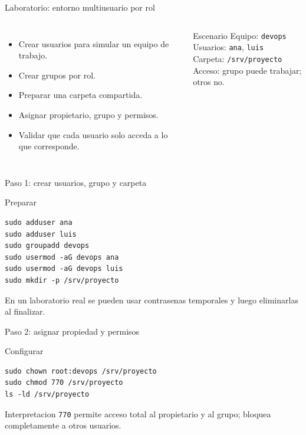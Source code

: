 \documentclass[aspectratio=169]{beamer}
\begin{document}
\begin{frame}{Laboratorio: entorno multiusuario por rol}
  \begin{columns}[c]
    \begin{itemize}
      \item Crear usuarios para simular un equipo de trabajo.
      \item Crear grupos por rol.
      \item Preparar una carpeta compartida.
      \item Asignar propietario, grupo y permisos.
      \item Validar que cada usuario solo acceda a lo que corresponde.
    \end{itemize}
    \begin{block}{Escenario}
      \small Equipo: \texttt{devops}\\
      Usuarios: \texttt{ana}, \texttt{luis}\\
      Carpeta: \texttt{/srv/proyecto}\\
      Acceso: grupo puede trabajar; otros no.
    \end{block}
  \end{columns}
\end{frame}

\begin{frame}[fragile]{Paso 1: crear usuarios, grupo y carpeta}
  \begin{exampleblock}{Preparar}
\begin{verbatim}
sudo adduser ana
sudo adduser luis
sudo groupadd devops
sudo usermod -aG devops ana
sudo usermod -aG devops luis
sudo mkdir -p /srv/proyecto
\end{verbatim}
  \end{exampleblock}
  \vfill
  \small En un laboratorio real se pueden usar contrasenas temporales y luego eliminarlas al finalizar.
\end{frame}

\begin{frame}[fragile]{Paso 2: asignar propiedad y permisos}
  \begin{exampleblock}{Configurar}
\begin{verbatim}
sudo chown root:devops /srv/proyecto
sudo chmod 770 /srv/proyecto
ls -ld /srv/proyecto
\end{verbatim}
  \end{exampleblock}
  \vfill
  \begin{block}{Interpretacion}
    \small \texttt{770} permite acceso total al propietario y al grupo; bloquea completamente a otros usuarios.
  \end{block}
\end{frame}
\end{document}
